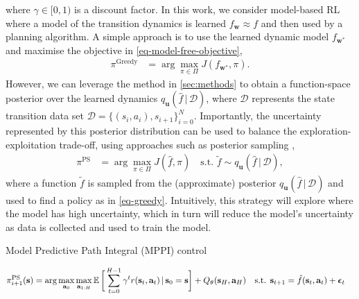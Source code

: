 \documentclass{article}
\newcommand{\state}{\ensuremath{\mathbf{s}}}
\newcommand{\action}{\ensuremath{\mathbf{a}}}
\newcommand{\noise}{\ensuremath{\bm\epsilon}}
\newcommand{\dataset}{\ensuremath{\mathcal{D}}}
\newcommand{\Horizon}{\ensuremath{H}}
\newcommand{\transitionFn}{\ensuremath{f}}
\newcommand{\policy}{\ensuremath{\pi}}
\renewcommand{\mid}{\,|\,}
\begin{document}
where $\gamma \in [0, 1)$ is a discount factor.
In this work, we consider model-based RL where a model of the transition dynamics is learned \(f_{\mathbf{w}} \approx \transitionFn\) and then used by a planning algorithm.
A simple approach is to use the learned dynamic model $f_{\mathbf{w}^{*}}$ and maximise the objective in \cref{eq-model-free-objective},
\begin{align} \label{eq-greedy}
  \policy^{\text{Greedy}} &= \arg \max_{\pi \in \Pi} J(f_{\mathbf{w}^{*}}, \pi).
\end{align}
However, we can leverage the method in \cref{sec:methods} to obtain a function-space posterior over the learned dynamics $q_{\mathbf{u}}(\hat{\transitionFn} \mid \dataset)$,
where $\mathcal{D}$ represents the state transition data set \(\mathcal{D} = \{(s_{i},a_{i}), s_{i+1}\}_{i=0}^{N}\).
Importantly, the uncertainty represented by this posterior distribution can be used to balance the exploration-exploitation trade-off,
using approaches such as posterior sampling \cite{osbandWhyPosteriorSampling2017,osbandMoreEfficientReinforcement2013},
\begin{align} \label{eq-posterior-sampling}
  \policy^{\text{PS}} &= \arg \max_{\pi \in \Pi} J(\hat{f}, \pi)
\quad \text{s.t. } \tilde{\transitionFn} \sim q_{\mathbf{u}}(\hat{\transitionFn} \mid \dataset),
\end{align}
where a function $\tilde{\transitionFn}$ is sampled from the (approximate) posterior $q_{\mathbf{u}}(\hat{\transitionFn} \mid \dataset)$ and used to find a policy as
in \cref{eq-greedy}.
Intuitively, this strategy will explore where the model has high uncertainty, which in turn will reduce the model's uncertainty as data is collected and used to
train the model.



Model Predictive Path Integral (MPPI) control
\cite{panSample2015}
\cite{williamsModel2017}

\begin{align} \label{eq-fast-update-mpc}
  \policy_{i+1}^{\text{PS}}(\state) = \arg \max_{\action_{0}} \max_{\action_{1:\Horizon}}
\E \bigg[ \sum_{t=0}^{H-1} \gamma^{t} r(\state_{t},\action_{t}) \mid \state_{0}=\state  \bigg] + Q_{\theta}(\state_{\Horizon}, \action_{H})
\quad \text{s.t. } \state_{t+1} &= \hat{\transitionFn}(\state_{t}, \action_{t}) + \noise_{t}
\end{align}
\end{document}
